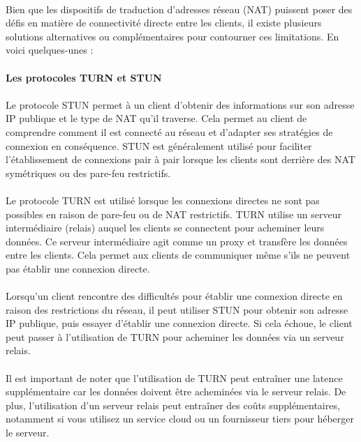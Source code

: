 \paragraph{}
Bien que les dispositifs de traduction d'adresses réseau (NAT) puissent poser des défis en matière de connectivité directe entre les clients, il existe plusieurs solutions alternatives ou complémentaires pour contourner ces limitations. En voici quelques-unes :

\paragraph{Les protocoles TURN et STUN}

\paragraph{}
Le protocole STUN permet à un client d'obtenir des informations sur son adresse IP publique et le type de NAT qu'il traverse. Cela permet au client de comprendre comment il est connecté au réseau et d'adapter ses stratégies de 
connexion en conséquence. STUN est généralement utilisé pour faciliter l'établissement de connexions pair à pair lorsque les clients sont derrière des NAT symétriques ou des pare-feu restrictifs.

\paragraph{}
Le protocole TURN est utilisé lorsque les connexions directes ne sont pas possibles en raison de pare-feu ou de NAT restrictifs. TURN utilise un serveur intermédiaire (relais) auquel les clients se connectent pour acheminer 
leurs données. Ce serveur intermédiaire agit comme un proxy et transfère les données entre les clients. Cela permet aux clients de communiquer même s'ils ne peuvent pas établir une connexion directe.

\paragraph{}
Lorsqu'un client rencontre des difficultés pour établir une connexion directe en raison des restrictions du réseau, il peut utiliser STUN pour obtenir son adresse IP publique, puis essayer d'établir une connexion directe. 
Si cela échoue, le client peut passer à l'utilisation de TURN pour acheminer les données via un serveur relais.

\paragraph{}
Il est important de noter que l'utilisation de TURN peut entraîner une latence supplémentaire car les données doivent être acheminées via le serveur relais. De plus, l'utilisation d'un serveur relais peut entraîner des coûts supplémentaires, 
notamment si vous utilisez un service cloud ou un fournisseur tiers pour héberger le serveur.
